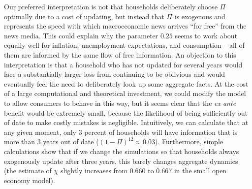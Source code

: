 \documentclass[titlepage]{./econtex}
\begin{document}
Our preferred interpretation is not that households deliberately choose $\Pi$ optimally due to a cost of updating, but instead that $\Pi$ is exogenous and represents the speed with which macroeconomic news arrives ``for free'' from the news media.  This could explain why the parameter $0.25$ seems to work about equally well for inflation, unemployment expectations, and consumption -- all of them are informed by the same flow of free information. An objection to this interpretation is that a household who has not updated for several years would face a substantially larger loss from continuing to be oblivious and would eventually feel the need to deliberately look up some aggregate facts.  At the cost of a large computational and theoretical investment, we could modify the model to allow consumers to behave in this way, but it seems clear that the {\it ex ante} benefit would be extremely small, because the likelihood of being sufficiently out of date to make costly mistakes is negligible.  Intuitively, we can calculate that at any given moment, only 3 percent of households will have information that is more than 3 years out of date ($(1-\Pi)^{12} \approx 0.03$).  Furthermore, simple calculations show that if we change the simulations so that households always exogenously update after three years, this barely changes aggregate dynamics (the estimate of $\chi$ slightly increases from 0.660 to 0.667 in the small open economy model).
\end{document}
